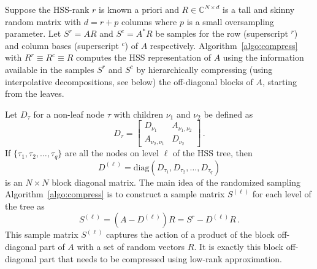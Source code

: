 \documentclass{article}
\begin{document}
Suppose the HSS-rank $r$ is known a priori and $R \in \mathbb{C}^{N
  \times d}$ is a tall and skinny random matrix with $d = r + p$
columns where $p$ is a small oversampling parameter.
Let $S^r = A R$ and $S^c = A^* R$ be samples for the row (superscript
$^r$) and column bases (superscript $^c$) of $A$
respectively. Algorithm~\ref{algo:compress} with $R^r \equiv R^c
\equiv R$ computes the HSS representation of $A$ using the information
available in the samples $S^r$ and $S^c$ by hierarchically compressing
(using interpolative decompositions, see below) the off-diagonal
blocks of $A$, starting from the leaves.

Let $D_\tau$ for a non-leaf node $\tau$ with children $\nu_1$ and
$\nu_2$  be defined as
\begin{equation}
  D_\tau = \begin{bmatrix} D_{\nu_1} & A_{\nu_1,\nu_2} \\ A_{\nu_2,\nu_1} & D_{\nu_2} \end{bmatrix} \, .
\end{equation}
If $\{\tau_1,\tau_2,\dots,\tau_q\}$ are all the nodes on level $\ell$
of the HSS tree, then 
\begin{equation}
  D^{(\ell)} = \mathrm{diag}(D_{\tau_1}, D_{\tau_2},\dots,D_{\tau_q})
\end{equation}
is an $N \times N$ block diagonal matrix. The main idea of the
randomized sampling Algorithm~\ref{algo:compress} is to construct a
sample matrix $S^{(\ell)}$ for each level of the tree as
\begin{equation}
  S^{(\ell)} = \left( A - D^{(\ell)} \right) R = S^r - D^{(\ell)} R \, .
\end{equation}
This sample matrix $S^{(\ell)}$ captures the action of a product of
the block off-diagonal part of $A$ with a set of random vectors
$R$. It is exactly this block off-diagonal part that needs to be
compressed using low-rank approximation.
\end{document}
